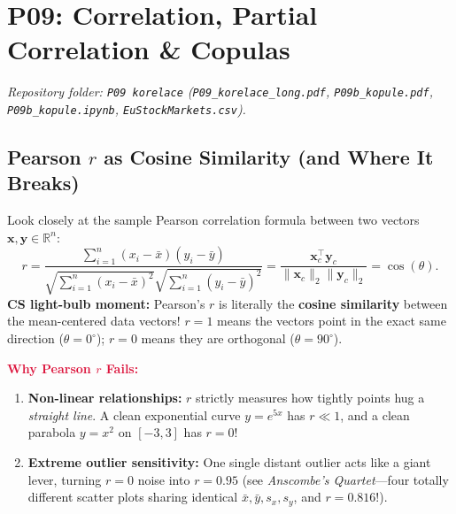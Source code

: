 \documentclass[11pt, a4paper]{article}
\begin{document}
\section{P09: Correlation, Partial Correlation \& Copulas}
\emph{Repository folder: \texttt{P09 korelace} (\texttt{P09\_korelace\_long.pdf}, \texttt{P09b\_kopule.pdf}, \texttt{P09b\_kopule.ipynb}, \texttt{EuStockMarkets.csv}).}

\subsection{Pearson $r$ as Cosine Similarity (and Where It Breaks)}
Look closely at the sample Pearson correlation formula between two vectors $\mathbf{x}, \mathbf{y} \in \mathbb{R}^n$:
\[
    r = \frac{\sum_{i=1}^n (x_i - \bar{x})(y_i - \bar{y})}{\sqrt{\sum_{i=1}^n (x_i - \bar{x})^2}\sqrt{\sum_{i=1}^n (y_i - \bar{y})^2}}
    = \frac{\mathbf{x}_c^\top \mathbf{y}_c}{\|\mathbf{x}_c\|_2 \|\mathbf{y}_c\|_2} = \cos(\theta).
\]
\textbf{CS light-bulb moment:} Pearson's $r$ is literally the \textbf{cosine similarity} between the mean-centered data vectors! $r = 1$ means the vectors point in the exact same direction ($\theta = 0^\circ$); $r = 0$ means they are orthogonal ($\theta = 90^\circ$).

\textcolor{crimson}{\textbf{Why Pearson $r$ Fails:}}
\begin{enumerate}
    \item \textbf{Non-linear relationships:} $r$ strictly measures how tightly points hug a \emph{straight line}. A clean exponential curve $y = e^{5x}$ has $r \ll 1$, and a clean parabola $y = x^2$ on $[-3, 3]$ has $r = 0$!
    \item \textbf{Extreme outlier sensitivity:} One single distant outlier acts like a giant lever, turning $r = 0$ noise into $r = 0.95$ (see \emph{Anscombe's Quartet}---four totally different scatter plots sharing identical $\bar{x}, \bar{y}, s_x, s_y$, and $r = 0.816$!).
\end{enumerate}
\end{document}
